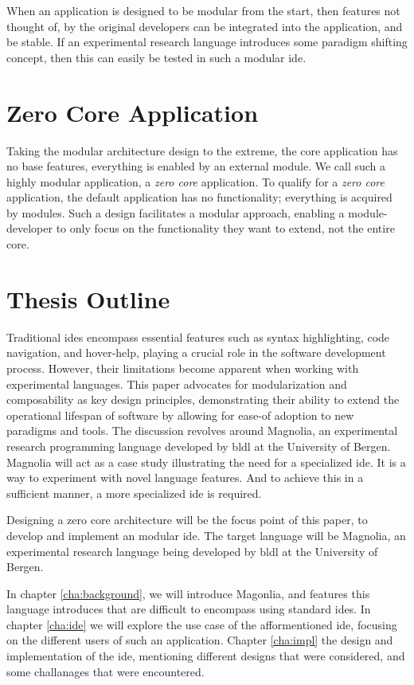 \begin{hyp} \label{hyp:modular}
  When an application is designed to be modular from the start, then features
  not thought of, by the original developers can be integrated into the
  application, and be stable. If an experimental research language introduces
  some paradigm shifting concept, then this can easily be tested in such a
  modular \gls{ide}.
\end{hyp}

\section{Zero Core Application}

Taking the modular architecture design to the extreme, the core application has
no base features, everything is enabled by an external module. We call such a
highly modular application, a \textit{zero core} application. To qualify for a
\textit{zero core} application, the default application has no functionality;
everything is acquired by modules. Such a design facilitates a modular approach,
enabling a module-developer to only focus on the functionality they want to
extend, not the entire core.

\section{Thesis Outline}

Traditional \gls{ide}s encompass essential features such as syntax highlighting,
code navigation, and hover-help, playing a crucial role in the software 
development process. However, their limitations become apparent when working with
experimental languages. This paper advocates for modularization and
composability as key design principles, demonstrating their ability to extend
the operational lifespan of software by allowing for ease-of adoption to new
paradigms and tools. The discussion revolves around Magnolia, an experimental
research programming language developed by \gls{bldl} at the University of
Bergen. Magnolia will act as a case study illustrating the need for a
specialized \gls{ide}. It is a way to experiment with novel language features.
And to achieve this in a sufficient manner, a more specialized \gls{ide} is
required.

Designing a zero core architecture will be the focus point of this paper, to
develop and implement an modular \gls{ide}. The target language will be Magnolia,
an experimental research language being developed by \gls{bldl} at the University
of Bergen.

In chapter \ref{cha:background}, we will introduce Magonlia, and features this
language introduces that are difficult to encompass using standard \gls{ide}s.
In chapter \ref{cha:ide} we will explore the use case of the afformentioned
\gls{ide}, focusing on the different users of such an application. Chapter
\ref{cha:impl} the design and implementation of the \gls{ide}, mentioning
different designs that were considered, and some challanages that were
encountered.
